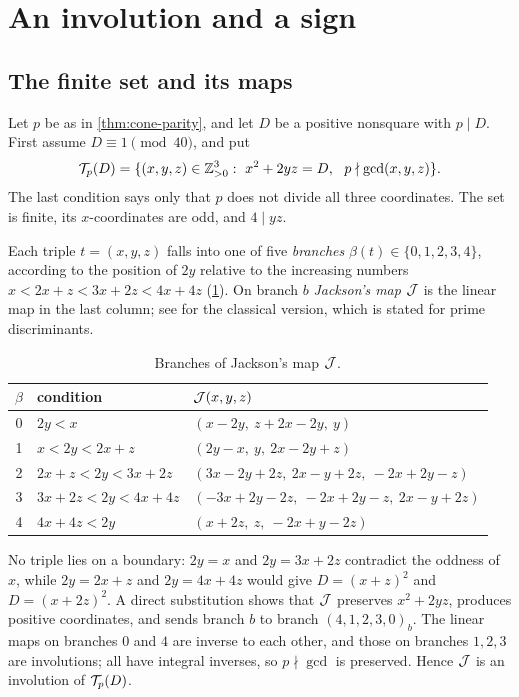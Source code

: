 \section{An involution and a sign}\label{sec:involution}

\subsection{The finite set and its maps}
Let $p$ be as in \cref{thm:cone-parity}, and let $D$ be a positive nonsquare with
$p\mid D$. First assume $D\equiv1\pmod{40}$, and put
\[
  \Tset_p(D)=\{(x,y,z)\in\Z_{>0}^3:\ x^2+2yz=D,\ \ p\nmid\gcd(x,y,z)\}.
\]
The last condition says only that $p$ does not divide all three coordinates.
The set is finite, its $x$-coordinates are odd, and $4\mid yz$.

Each triple $t=(x,y,z)$ falls into one of five \emph{branches}
$\beta(t)\in\{0,1,2,3,4\}$, according to the position of $2y$ relative to the
increasing numbers $x<2x+z<3x+2z<4x+4z$ (\cref{tab:jackson}). On branch $b$
\emph{Jackson's map} $\mathcal J$ is the linear map in the last column; see \cite{Jackson}
for the classical version, which is stated for prime discriminants.

\begin{table}[ht]
\caption{Branches of Jackson's map $\mathcal J$.}\label{tab:jackson}
\begin{tabular}{cll}
\toprule
$\beta$ & condition & $\mathcal J(x,y,z)$\\
\midrule
0 & $2y<x$ & $(x-2y,\ z+2x-2y,\ y)$\\
1 & $x<2y<2x+z$ & $(2y-x,\ y,\ 2x-2y+z)$\\
2 & $2x+z<2y<3x+2z$ & $(3x-2y+2z,\ 2x-y+2z,\ -2x+2y-z)$\\
3 & $3x+2z<2y<4x+4z$ & $(-3x+2y-2z,\ -2x+2y-z,\ 2x-y+2z)$\\
4 & $4x+4z<2y$ & $(x+2z,\ z,\ -2x+y-2z)$\\
\bottomrule
\end{tabular}
\end{table}

No triple lies on a boundary: $2y=x$ and $2y=3x+2z$ contradict the oddness of
$x$, while $2y=2x+z$ and $2y=4x+4z$ would give $D=(x+z)^2$ and $D=(x+2z)^2$. A
direct substitution shows that $\mathcal J$ preserves $x^2+2yz$, produces positive
coordinates, and sends branch $b$ to branch $(4,1,2,3,0)_b$. The linear maps on
branches $0$ and $4$ are inverse to each other, and those on branches $1,2,3$
are involutions; all have integral inverses, so $p\nmid\gcd$ is preserved. Hence
$\mathcal J$ is an involution of $\mathcal T_p(D)$.

